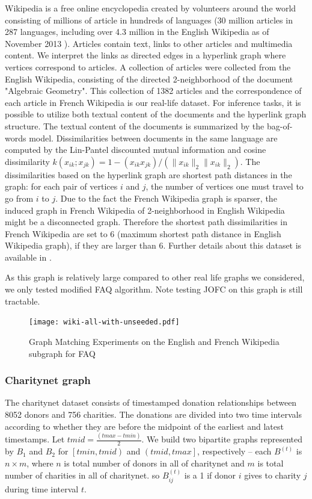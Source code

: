 \documentclass[12pt,oneside,final]{thesis}\usepackage[]{graphicx}\usepackage[]{color}
\begin{document}
Wikipedia is a free online encyclopedia created by volunteers around the world consisting of millions of article in hundreds of languages (30 million articles in 287 languages, including over 4.3 million in the English Wikipedia as of November 2013 \cite{wikipedia}). Articles contain text, links to other articles and multimedia content. We interpret the links as directed edges in a hyperlink graph where vertices correspond to articles. A collection of articles were collected from the English Wikipedia, consisting of the
 directed 2-neighborhood of the document "Algebraic Geometry". 
   This  collection of 1382 articles and the correspondence of each article in French 
Wikipedia is our real-life dataset. For inference tasks, it is possible to utilize both textual content of the documents and the hyperlink graph structure. The textual content of the documents is summarized by the bag-of-words model. Dissimilarities between documents  in the same language are computed by the Lin-Pantel discounted mutual information \cite{LinPantel,PantelLin}
 and cosine dissimilarity $k(x_{ik}; x_{jk}) = 1 - (x_{ik} x_{jk})/(\|x_{ik}\|_2\|x_{ik}\|_2)$. 
 The dissimilarities based on the hyperlink graph are shortest path distances in the graph:
 for each pair of vertices $i$ and $j$, the number of vertices one must travel to go from $i$ to $j$. Due to the fact the French Wikipedia graph is sparser, the induced graph in French Wikipedia of 2-neighborhood in English Wikipedia might be a disconnected graph. Therefore the shortest path dissimilarities in French Wikipedia are set to 6 (maximum shortest path distance in English Wikipedia graph), if they are larger than 6.  Further details about this dataset is available in \cite{Zhiliang_disparate}.
 
 As this graph is relatively large compared to other real life graphs we considered, we only tested modified FAQ algorithm. Note testing JOFC on this graph is still tractable.

\begin{figure}
\texttt{[image: wiki-all-with-unseeded.pdf]}
\caption{Graph Matching Experiments on the English and French Wikipedia subgraph for FAQ \label{wiki_graphmatch}}
\end{figure}
      
\subsubsection{Charitynet graph}

The charitynet dataset consists  of timestamped donation relationships between 8052 donors and 756 charities. The donations are divided into two time intervals according to whether they are before the midpoint of the earliest and latest timestamps.
Let $tmid = \frac{(tmax - tmin)}{2}$.
We build two bipartite graphs represented by $B_1$ and $B_2$ for $\left[tmin,tmid\right)$ and $\left(tmid,tmax\right]$, respectively --
each $B^{(t)}$ is $n \times m$, where $n$ is total number of donors in all of charitynet and $m$ is total number of charities in all of charitynet.
so $B_{ij}^{(t)}$ is a 1 if donor $i$ gives to charity $j$ during time interval $t$.
\end{document}
